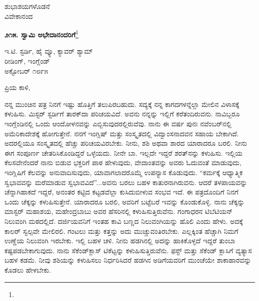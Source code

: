\vspace{-0.5cm}

{\flushright
ಶುಭಾಶಯಗಳೊಡನೆ\\ವಿವೇಕಾನಂದ\par}

\begin{center}
\textbf{೨೧೫. ಸ್ವಾಮಿ ಅಭೇದಾನಂದರಿಗೆ}\footnote{}
\end{center}

\vspace{-0.5cm}

\begin{flushright}
 ಇ.ಟಿ. ಸ್ಟರ್ಡಿ, ಹೈ ವ್ಯೂ, ಕ್ಯಾವರ್ ಶ್ಯಾಮ್\\ರೀಡಿಂಗ್, ಇಂಗ್ಲೆಂಡ್\\ಅಕ್ಟೋಬರ್ ೧೮೯೫
\end{flushright}

\vspace{-0.3cm}

\noindent
ಪ್ರಿಯ ಕಾಳಿ,

ನನ್ನ ಮುಂಚಿನ ಪತ್ರ ನಿನಗೆ ಇಷ್ಟು ಹೊತ್ತಿಗೆ ತಲುಪಿರಬಹುದು. ಸದ್ಯಕ್ಕೆ ನನ್ನ ಕಾಗದಗಳನ್ನೆಲ್ಲಾ ಮೇಲಿನ ವಿಳಾಸಕ್ಕೆ ಕಳುಹಿಸು. ಮಿಸ್ಟರ್‌ ಸ್ಟರ್ಡಿಗೆ ತಾರಕ್‌ದಾ ಪರಿಚಯವಿದೆ. ಅವನು ನನ್ನನ್ನು ಇಲ್ಲಿಗೆ ಕರೆತಂದಿರುವನು. ನಾವಿಬ್ಬರೂ ಇಂಗ್ಲೆಂಡಿನಲ್ಲಿ ಒಂದು ಆಂದೋಳನವನ್ನು ಎಬ್ಬಿಸುವುದರಲ್ಲಿರುವೆವು. ನಾನು ಈ ವರ್ಷ ಪುನಃ ನವೆಂಬರ್‌ನಲ್ಲಿ ಅಮೆರಿಕಾದೇಶಕ್ಕೆ ಹೋಗುತ್ತೇನೆ. ನನಗೆ ಇಂಗ್ಲಿಷ್ ಮತ್ತು ಸಂಸ್ಕೃತದಲ್ಲಿ ವಿದ್ವಾಂಸನಾದವನ ಸಹಾಯ ಬೇಕಾಗಿದೆ. ಅದರಲ್ಲಿಯೂ ಸಂಸ್ಕೃತದಲ್ಲಿ ಹೆಚ್ಚು ಪರಿಚಯವಿರಬೇಕು. ನೀನು, ಶಶಿ ಅಥವಾ ಶಾರದ ಯಾರಾದರೂ ಬರಲಿ. ನೀನು ಈಗ ಸಂಪೂರ್ಣ ಚೇತರಿಸಿಕೊಂಡಿದ್ದರೆ ಒಳ್ಳೆಯದು. ನೀನೇ ಬಾ. ಇಲ್ಲದೇ ಇದ್ದರೆ ಶರತ್‌ನನ್ನು ಕಳುಹಿಸು. ಇಲ್ಲಿಯ ಕೆಲಸವೇನೆಂದರೆ ನಾನು ಬಿಡುವ ಭಕ್ತರಿಗೆ ಪಾಠ ಹೇಳುವುದು, ವೇದಾಂತವನ್ನು ಅವರು ಓದುವಂತೆ ಮಾಡುವುದು, ಇಂಗ್ಲಿಷಿಗೆ ಕೆಲವನ್ನು ಅನುವಾದಿಸುವುದು, ಯಾವಾಗಲಾದರೊಮ್ಮೆ ಉಪನ್ಯಾಸ ಕೊಡುವುದು. ``ಕರ್ಮಕ್ಕೆ ಆಧ್ಯಾತ್ಮಿಕ ಸ್ವಭಾವವನ್ನು ಮರೆಮಾಡುವ ಸ್ವಭಾವವಿದೆ''...ಅವನು ಬರಲು ಬಹಳ ಕಾತುರನಾಗಿರುವನು. ಆದರೆ ತಳಪಾಯವನ್ನು ಚೆನ್ನಾಗಿಹಾಕದೆ ಇದ್ದರೆ, ಅನಂತರ ಕಟ್ಟಿದ ಕಟ್ಟಡವೆಲ್ಲಾ ಕುಸಿದುಬೀಳುವ ಸಂಭವ ಇದೆ. ಈ ಪತ್ರದೊಂದಿಗೆ ನಿನಗೆ ಒಂದು ಚೆಕ್ಕನ್ನು ಕಳುಹಿಸುತ್ತೇನೆ. ಯಾರಾದರೂ ಬರಲಿ, ಅವರಿಗೆ ಬಟ್ಟೆಬರೆ ಇವನ್ನು ಕೊಂಡುಕೊಳ್ಳಿ. ನಾನು ಚೆಕ್ಕನ್ನು ಮಾಸ್ಟರ್ ಮಹಾಶಯ, ಮಹೇಂದ್ರಬಾಬು ಅವರ ಹೆಸರಿನಲ್ಲಿ ಕಳುಹಿಸುತ್ತಿರುವೆನು. ಗಂಗಾಧರನ ಟಿಬೆಟಿಯನ್ ನಿಲುವಂಗಿ ಮಠದಲ್ಲಿದೆ. ದರ್ಜಿಯವನಿಗೆ ಇಂತಹ ಕಾವಿ ಬಣ್ಣದ ನಿಲುವಂಗಿಯನ್ನು ಹೊಲಿ ಎಂದು ಹೇಳು. ಅದಕ್ಕೆ ಕಾಲರ್ ಸ್ವಲ್ಪವೇ ಮೇಲಿರಲಿ. ಗಂಟಲು ಮತ್ತು ಕತ್ತನ್ನು ಅದು ಮುಚ್ಚುವಂತಿರಬೇಕು. ಎಲ್ಲಕ್ಕಿಂತ ಹೆಚ್ಚಾಗಿ ನಿಮಗೆ ಉಣ್ಣೆಯ ನಿಲುವಂಗಿ ಇರಬೇಕು. ಇಲ್ಲಿ ಬಹಳ ಚಳಿ. ನೀನು ಹಡಗಿನಲ್ಲಿ ಅದನ್ನು ಹಾಕಿಕೊಳ್ಳದೆ ಇದ್ದರೆ ತುಂಬಾ ಕಷ್ಟಪಡಬೇಕಾಗುವುದು. ನಾನು ಸೆಕೆಂಡ್‌ಕ್ಲಾಸ್ ಟಿಕೆಟ್ಟನ್ನು ಕಳುಹಿಸುತ್ತಿರುವೆನು. ಫಸ್ಟ್ ಮತ್ತು ಸೆಕೆಂಡ್ ಕ್ಲಾಸಿಗೆ ವ್ಯತ್ಯಾಸ ಬಹಳ ಕಡಮೆ. ನೀವು ಶಶಿಯನ್ನು ಕಳುಹಿಸಲು ನಿರ್ಧರಿಸಿದರೆ ಹಡಗಿನ ಅಡಿಗೆಯವರಿಗೆ ಮುಂಚೆಯೇ ಶಾಕಾಹಾರವನ್ನು ಕೊಡಲು ಹೇಳಬೇಕು.

